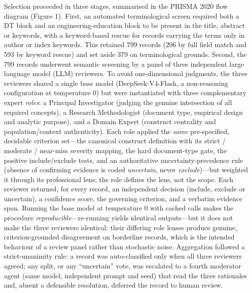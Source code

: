 Selection proceeded in three stages, summarised in the PRISMA 2020 flow diagram
(Figure 1). First, an automated terminological screen required both a DT block
and an engineering-education block to be present in the title, abstract or
keywords, with a keyword-based rescue for records carrying the terms only in
author or index keywords. This retained 799 records (206 by full field match and
593 by keyword rescue) and set aside 379 on terminological grounds. Second, the
799 records underwent semantic screening by a panel of three independent large
language model (LLM) reviewers. To avoid one-dimensional judgments, the three
reviewers shared a single base model (DeepSeek-V4-Flash, a non-reasoning
configuration at temperature 0) but were instantiated with three complementary
expert \emph{roles}: a Principal Investigator (judging the genuine intersection of all
required concepts), a Research Methodologist (document type, empirical design and
analytic purpose), and a Domain Expert (construct centrality and population/context
authenticity). Each role applied the \emph{same} pre-specified, decidable criterion
set---the canonical construct definition with its strict / moderate / near-miss
severity mapping, the hard document-type gate, the positive include/exclude tests,
and an authoritative uncertainty-precedence rule (absence of confirming evidence is
coded \emph{uncertain}, never \emph{exclude})---but weighted it through its professional lens;
the role defines the lens, not the scope. Each reviewer returned, for every record,
an independent decision (include, exclude or uncertain), a confidence score, the
governing criterion, and a verbatim evidence span. Running the base model at
temperature 0 with cached calls makes the procedure \emph{reproducible}---re-running
yields identical outputs---but it does not make the three reviewers identical: their
differing role lenses produce genuine, criterion-grounded disagreement on
borderline records, which is the intended behaviour of a review panel rather than
stochastic noise. Aggregation followed a strict-unanimity rule: a record was
auto-classified only when all three reviewers agreed; any split, or any ``uncertain''
vote, was escalated to a fourth moderator agent (same model, independent prompt and
seed) that read the three rationales and, absent a defensible resolution, deferred
the record to human review.

